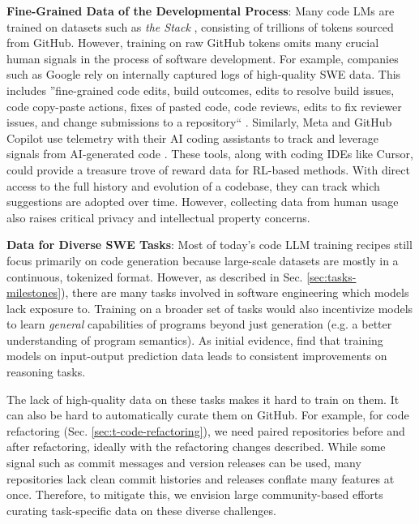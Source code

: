 \textbf{Fine-Grained Data of the Developmental Process}: Many code LMs are trained on datasets such as \textit{the Stack} \citep{kocetkov2022stack, lozhkov2024starcoder}, consisting of trillions of tokens sourced from GitHub. However, training on raw GitHub tokens omits many crucial human signals in the process of software development. For example, companies such as Google rely on internally captured logs of high-quality SWE data. This includes ''fine-grained code edits, build outcomes, edits to resolve build issues, code copy-paste actions, fixes of pasted code, code reviews, edits to fix reviewer issues, and change submissions to a repository`` \citep{chandra2024ai}. Similarly, Meta and GitHub Copilot use telemetry with their AI coding assistants to track and leverage signals from AI-generated code \citep{murali2024ai, ziegler2024measuring}. These tools, along with coding IDEs like Cursor, could provide a treasure trove of reward data for RL-based methods. With direct access to the full history and evolution of a codebase, they can track which suggestions are adopted over time. However, collecting data from human usage also raises critical privacy and intellectual property concerns.

\textbf{Data for Diverse SWE Tasks}: Most of today's code LLM training recipes still focus primarily on code generation because large-scale datasets are mostly in a continuous, tokenized format. However, as described in Sec. \ref{sec:tasks-milestones}), there are many tasks involved in software engineering which models lack exposure to. Training on a broader set of tasks would also incentivize models to learn \textit{general} capabilities of programs beyond just generation (e.g. a better understanding of program semantics). As initial evidence, \cite{li2025codei} find that training models on input-output prediction data leads to consistent improvements on reasoning tasks. 

The lack of high-quality data on these tasks makes it hard to train on them. It can also be hard to automatically curate them on GitHub. For example, for code refactoring (Sec. \ref{sec:t-code-refactoring}), we need paired repositories before and after refactoring, ideally with the refactoring changes described. While some signal such as commit messages and version releases can be used, many repositories lack clean commit histories and releases conflate many features at once. Therefore, to mitigate this, we envision large community-based efforts curating task-specific data on these diverse challenges. 


